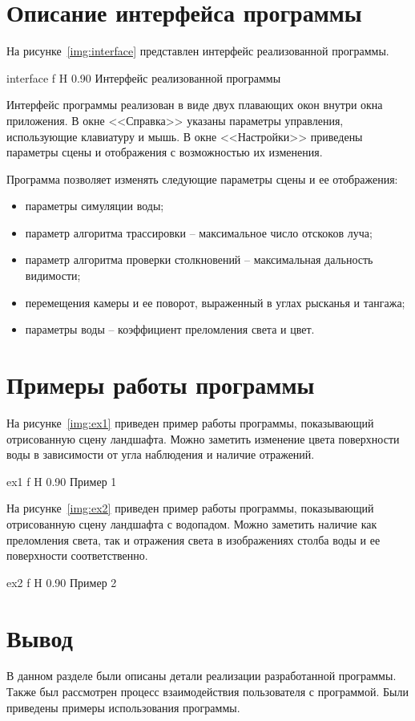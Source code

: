\section{Описание интерфейса программы}

На рисунке~\ref{img:interface} представлен интерфейс реализованной программы.

    {interface}
    {f}
    {H}
    {0.90\textwidth}
    {Интерфейс реализованной программы}

Интерфейс программы реализован в виде двух плавающих окон внутри окна приложения.
В окне <<Справка>> указаны параметры управления, использующие клавиатуру и мышь.
В окне <<Настройки>> приведены параметры сцены и отображения с возможностью их изменения.

Программа позволяет изменять следующие параметры сцены и ее отображения:
\begin{itemize}
    \item параметры симуляции воды;
    \item параметр алгоритма трассировки -- максимальное число отскоков луча;
    \item параметр алгоритма проверки столкновений -- максимальная дальность видимости;
    \item перемещения камеры и ее поворот, выраженный в углах рысканья и тангажа;
    \item параметры воды -- коэффициент преломления света и цвет.
\end{itemize}

\section{Примеры работы программы}

На рисунке~\ref{img:ex1} приведен пример работы программы, показывающий отрисованную 
сцену ландшафта. Можно заметить изменение цвета поверхности воды в зависимости
от угла наблюдения и наличие отражений.

    {ex1}
    {f}
    {H}
    {0.90\textwidth}
    {Пример 1}

На рисунке~\ref{img:ex2} приведен пример работы программы, показывающий отрисованную сцену ландшафта
с водопадом. Можно заметить наличие как преломления света, так и отражения света 
в изображениях столба воды и ее поверхности соответственно.

    {ex2}
    {f}
    {H}
    {0.90\textwidth}
    {Пример 2}

\section*{Вывод}

В данном разделе были описаны детали реализации разработанной программы. 
Также был рассмотрен процесс взаимодействия пользователя с программой.
Были приведены примеры использования программы.
